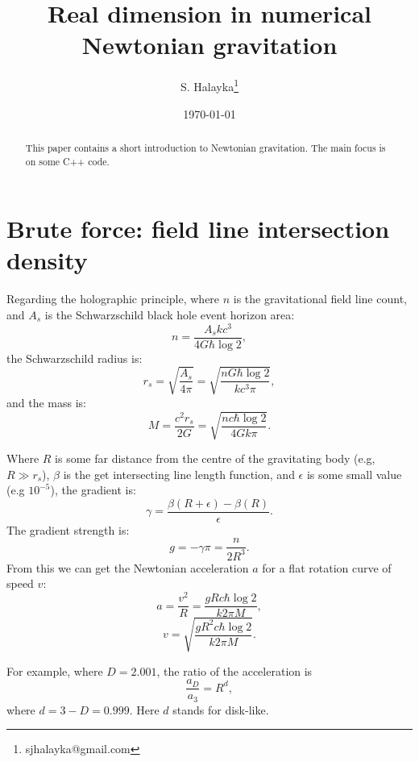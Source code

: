 \documentclass[12pt]{article}
\title{Real dimension in numerical Newtonian gravitation}
\author{S. Halayka\footnote{sjhalayka@gmail.com}}
\date{\today\;\currenttime}
\begin{document}
 
\maketitle

\begin{abstract}
This paper contains a short introduction to Newtonian gravitation.
The main focus is on some C++ code.
\end{abstract}






\section{Brute force: field line intersection density}
Regarding the holographic principle, where $n$ is the gravitational field line count, and $A_s$ is the Schwarzschild black hole event horizon area:
\begin{equation}
n = \frac{A_s k c^3}{ 4 G \hbar \log 2},
\end{equation}
the Schwarzschild radius is:
\begin{equation}
r_s = \sqrt{\frac{A_s}{4 \pi}} = \sqrt{\frac{n G \hbar \log 2}{k c^3 \pi}},
\end{equation}
and the mass is:
\begin{equation}
M = \frac{c^2 r_s}{2 G} = \sqrt{\frac{n c \hbar \log 2}{4 G k \pi}}. 
\end{equation}

Where $R$ is some far distance from the centre of the gravitating body (e.g, $R \gg r_s$), $\beta$ is the get intersecting line length function, and $\epsilon$ is some small value (e.g $10^{-5}$), the gradient is:
\begin{equation}
\gamma = \frac{\beta(R + \epsilon) - \beta(R)}{\epsilon}.
\end{equation}
The gradient strength is:
\begin{equation}
g = -\gamma \pi = \frac{n}{2 R^3}.
\end{equation}
From this we can get the Newtonian acceleration $a$ for a flat rotation curve of speed $v$:
\begin{equation}
\label{a_equation}
a = \frac{v^2}{R} = \frac{g R c \hbar \log 2}{k 2 \pi M},
\end{equation}
\begin{equation}
v = \sqrt{\frac{g R^2 c \hbar \log 2}{k 2 \pi M}}.
\end{equation}

For example, where $D = 2.001$, the ratio of the acceleration is
\begin{equation}
\frac{a_{D}}{a_{3}} = R^{d}, 
\end{equation}
where $d = 3 - D = 0.999$.
Here $d$ stands for disk-like.
\end{document}
